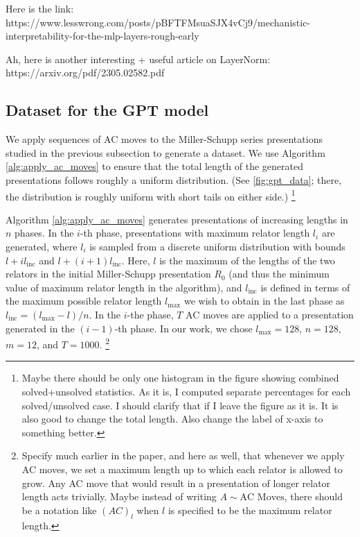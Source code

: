 Here is the link: https://www.lesswrong.com/posts/pBFTFMsuaSJX4vCj9/mechanistic-interpretability-for-the-mlp-layers-rough-early

Ah, here is another interesting + useful article on LayerNorm: https://arxiv.org/pdf/2305.02582.pdf


\subsection{Dataset for the GPT model}

We apply sequences of AC moves to the Miller-Schupp series presentations studied in the previous subsection to generate a dataset.
We use Algorithm \autoref{alg:apply_ac_moves} to ensure that the total length of the generated presentations follows roughly a uniform distribution.
(See \autoref{fig:gpt_data}; there, the distribution is roughly uniform with short tails on either side.)
\footnote{Maybe there should be only one histogram in the figure showing combined solved+unsolved statistics.
As it is, I computed separate percentages for each solved/unsolved case.
I should clarify that if I leave the figure as it is.
It is also good to change the total length.
Also change the label of x-axis to something better.}

Algorithm \autoref{alg:apply_ac_moves} generates presentations of increasing lengths in $n$ phases.
In the $i$-th phase, presentations with maximum relator length $l_i$ are generated, where $l_i$ is sampled from a discrete uniform distribution with bounds $l + i l_{\text{inc}} $ and $l + (i+1) l_{\text{inc}}$.
Here, $l$ is the maximum of the lengths of the two relators in the initial Miller-Schupp presentation $R_0$ (and thus the minimum value of maximum relator length in the algorithm), and $l_{\text{inc}}$ is defined in terms of the maximum possible relator length $l_{\text{max}}$ we wish to obtain in the last phase as $l_{\text{inc}} = (l_{\text{max}}-l)/n$.
In the $i$-the phase, $T$ AC moves are applied to a presentation generated in the $(i-1)$-th phase.
In our work, we chose $l_{\text{max}}=128$, $n=128$, $m=12$, and $T=1000$.
\footnote{Specify much earlier in the paper, and here as well, that whenever we apply AC moves, we set a maximum length up to which each relator is allowed to grow.
Any AC move that would result in a presentation of longer relator length acts trivially.
Maybe instead of writing $A \sim \text{AC Moves}$, there should be a notation like $(AC)_l$ when $l$ is specified to be the maximum relator length.}

